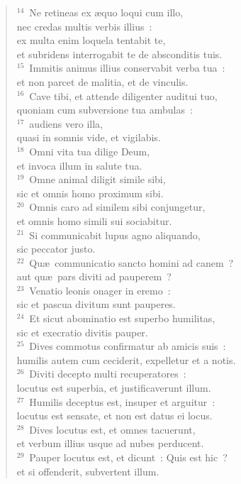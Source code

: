 \begin{flushleft}
\begin{verse}
${}^{14}$~Ne retineas ex \ae quo loqui cum illo,\\ nec credas multis verbis illius~:\\ ex multa enim loquela tentabit te,\\ et subridens interrogabit te de absconditis tuis.\\
${}^{15}$~Immitis animus illius conservabit verba tua~:\\ et non parcet de malitia, et de vinculis.\\
${}^{16}$~Cave tibi, et attende diligenter auditui tuo,\\ quoniam cum subversione tua ambulas~:\\
${}^{17}$~audiens vero illa,\\ quasi in somnis vide, et vigilabis.\\
${}^{18}$~Omni vita tua dilige Deum,\\ et invoca illum in salute tua.\\
${}^{19}$~Omne animal diligit simile sibi,\\ sic et omnis homo proximum sibi.\\
${}^{20}$~Omnis caro ad similem sibi conjungetur,\\ et omnis homo simili sui sociabitur.\\
${}^{21}$~Si communicabit lupus agno aliquando,\\ sic peccator justo.\\
${}^{22}$~Qu\ae\ communicatio sancto homini ad canem~?\\ aut qu\ae\ pars diviti ad pauperem~?\\
${}^{23}$~Venatio leonis onager in eremo~:\\ sic et pascua divitum sunt pauperes.\\
${}^{24}$~Et sicut abominatio est superbo humilitas,\\ sic et execratio divitis pauper.\\
${}^{25}$~Dives commotus confirmatur ab amicis suis~:\\ humilis autem cum ceciderit, expelletur et a notis.\\
${}^{26}$~Diviti decepto multi recuperatores~:\\ locutus est superbia, et justificaverunt illum.\\
${}^{27}$~Humilis deceptus est, insuper et arguitur~:\\ locutus est sensate, et non est datus ei locus.\\
${}^{28}$~Dives locutus est, et omnes tacuerunt,\\ et verbum illius usque ad nubes perducent.\\
${}^{29}$~Pauper locutus est, et dicunt~: Quis est hic~?\\ et si offenderit, subvertent illum.\end{verse}\end{flushleft}


